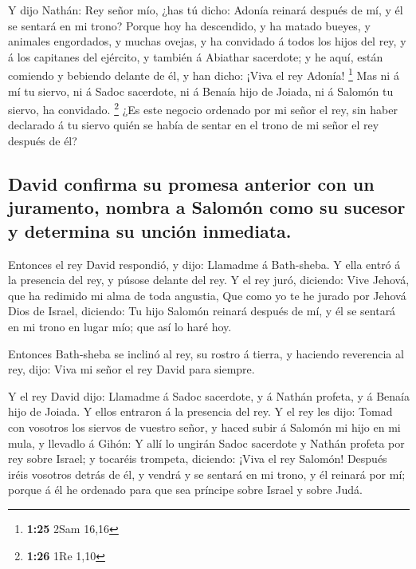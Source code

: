  Y dijo Nathán: Rey señor mío, ¿has tú dicho: Adonía
reinará después de mí, y él se sentará en mi trono?  Porque
hoy ha descendido, y ha matado bueyes, y animales engordados, y muchas
ovejas, y ha convidado á todos los hijos del rey, y á los capitanes del
ejército, y también á Abiathar sacerdote; y he aquí, están comiendo y
bebiendo delante de él, y han dicho: ¡Viva el rey Adonía! \footnote{\textbf{1:25}
  2Sam 16,16}  Mas ni á mí tu siervo, ni á Sadoc sacerdote,
ni á Benaía hijo de Joiada, ni á Salomón tu siervo, ha convidado.
\footnote{\textbf{1:26} 1Re 1,10}  ¿Es este negocio
ordenado por mi señor el rey, sin haber declarado á tu siervo quién se
había de sentar en el trono de mi señor el rey después de él?

\hypertarget{david-confirma-su-promesa-anterior-con-un-juramento-nombra-a-salomuxf3n-como-su-sucesor-y-determina-su-unciuxf3n-inmediata.}{%
\subsection{David confirma su promesa anterior con un juramento, nombra
a Salomón como su sucesor y determina su unción
inmediata.}\label{david-confirma-su-promesa-anterior-con-un-juramento-nombra-a-salomuxf3n-como-su-sucesor-y-determina-su-unciuxf3n-inmediata.}}

 Entonces el rey David respondió, y dijo: Llamadme á
Bath-sheba. Y ella entró á la presencia del rey, y púsose delante del
rey.  Y el rey juró, diciendo: Vive Jehová, que ha redimido
mi alma de toda angustia,  Que como yo te he jurado por
Jehová Dios de Israel, diciendo: Tu hijo Salomón reinará después de mí,
y él se sentará en mi trono en lugar mío; que así lo haré hoy.

 Entonces Bath-sheba se inclinó al rey, su rostro á tierra,
y haciendo reverencia al rey, dijo: Viva mi señor el rey David para
siempre.

 Y el rey David dijo: Llamadme á Sadoc sacerdote, y á
Nathán profeta, y á Benaía hijo de Joiada. Y ellos entraron á la
presencia del rey.  Y el rey les dijo: Tomad con vosotros
los siervos de vuestro señor, y haced subir á Salomón mi hijo en mi
mula, y llevadlo á Gihón:  Y allí lo ungirán Sadoc
sacerdote y Nathán profeta por rey sobre Israel; y tocaréis trompeta,
diciendo: ¡Viva el rey Salomón!  Después iréis vosotros
detrás de él, y vendrá y se sentará en mi trono, y él reinará por mí;
porque á él he ordenado para que sea príncipe sobre Israel y sobre Judá.

